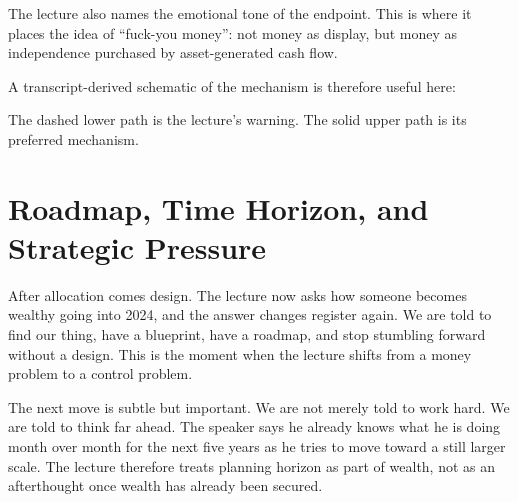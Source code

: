 The lecture also names the emotional tone of the endpoint. This is where it places the idea of ``fuck-you money'': not money as display, but money as independence purchased by asset-generated cash flow.

A transcript-derived schematic of the mechanism is therefore useful here:

\begin{figure}[h]
\centering
{}
\end{figure}

The dashed lower path is the lecture's warning. The solid upper path is its preferred mechanism.

\section{Roadmap, Time Horizon, and Strategic Pressure}

After allocation comes design. The lecture now asks how someone becomes wealthy going into 2024, and the answer changes register again. We are told to find our thing, have a blueprint, have a roadmap, and stop stumbling forward without a design. This is the moment when the lecture shifts from a money problem to a control problem.

The next move is subtle but important. We are not merely told to work hard. We are told to think far ahead. The speaker says he already knows what he is doing month over month for the next five years as he tries to move toward a still larger scale. The lecture therefore treats planning horizon as part of wealth, not as an afterthought once wealth has already been secured.

